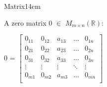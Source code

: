 \begin{definition}{Matrix}{14cm}
        \vspace{0.3cm}



        A {\color{lblue} zero matrix} 0 $\in$ $M_{m \times n}(\mathbb{R})$:

        \hspace{0.5cm}
        0 = 
        $
        \begin{bmatrix}
            0_{11} & 0_{12} & a_{13} & \hdots & 0_{1n} \\
            0_{21} & 0_{22} & a_{23} & \hdots & 0_{2n} \\
            0_{31} & 0_{32} & a_{33} & \hdots & 0_{3n} \\
            \vdots & \vdots & \vdots & \ddots & \vdots \\
            0_{m1} & 0_{m2} & a_{m3} & \hdots & 0_{mn} \\
        \end{bmatrix}
        $
    \end{definition}

    \vspace{0.5cm}



